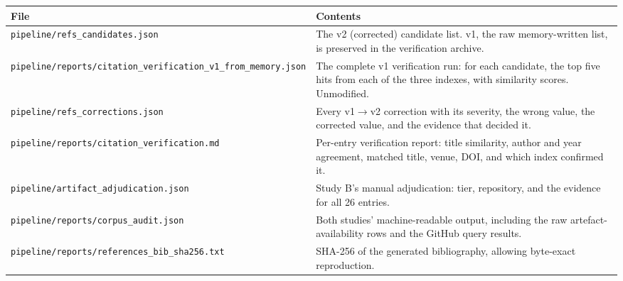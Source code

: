 \documentclass[11pt,a4paper]{article}
\begin{document}
\begin{table}[h]
\centering
\small
\begin{tabularx}{\textwidth}{@{}l X@{}}
\toprule
\textbf{File} & \textbf{Contents} \\
\midrule
\texttt{pipeline/refs\_candidates.json} &
The v2 (corrected) candidate list. v1, the raw memory-written list, is
preserved in the verification archive. \\
\texttt{pipeline/reports/citation\_verification\_v1\_from\_memory.json} &
The complete v1 verification run: for each candidate, the top five hits from
each of the three indexes, with similarity scores. Unmodified. \\
\texttt{pipeline/refs\_corrections.json} &
Every v1$\rightarrow$v2 correction with its severity, the wrong value, the
corrected value, and the evidence that decided it. \\
\texttt{pipeline/reports/citation\_verification.md} &
Per-entry verification report: title similarity, author and year agreement,
matched title, venue, DOI, and which index confirmed it. \\
\texttt{pipeline/artifact\_adjudication.json} &
Study B's manual adjudication: tier, repository, and the evidence for all 26
entries. \\
\texttt{pipeline/reports/corpus\_audit.json} &
Both studies' machine-readable output, including the raw artefact-availability
rows and the GitHub query results. \\
\texttt{pipeline/reports/references\_bib\_sha256.txt} &
SHA-256 of the generated bibliography, allowing byte-exact reproduction. \\
\bottomrule
\end{tabularx}
\end{table}
\end{document}
